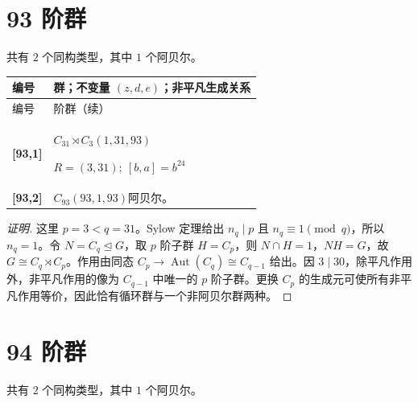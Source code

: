 \documentclass[UTF8,fontset=fandol,11pt,a4paper]{ctexart}
\newcommand{\Aut}{\operatorname{Aut}}\newcommand{\GL}{\operatorname{GL}}\newcommand{\ord}{\operatorname{ord}}\newcommand{\Z}{\mathrm Z}
\begin{document}
\section*{93 阶群}\label{order:93}

共有 $2$ 个同构类型，其中 $1$ 个阿贝尔。

\begingroup\small\setlength{\tabcolsep}{3pt}\renewcommand{\arraystretch}{1.12}

\begin{longtable}{@{}p{17mm}>{\raggedright\arraybackslash}p{141mm}@{}}

\toprule 编号 & 群；不变量 $(z,d,e)$；非平凡生成关系\\\midrule\endfirsthead

\toprule 编号 & 93 阶群（续）\\\midrule\endhead\bottomrule\endfoot

\textbf{[93,1]} & $C_{31}\rtimes C_{3}$\quad $(1,31,93)$\par\(R=(3,31);\allowbreak\ [b,a]=b^{24}\)\\[3pt]

\textbf{[93,2]} & $C_{93}$\quad $(93,1,93)$\quad 阿贝尔。\\[3pt]

\end{longtable}\endgroup

\begin{proof}[证明]
这里 $p=3<q=31$。Sylow 定理给出 $n_q\mid p$ 且 $n_q\equiv1\pmod q$，所以 $n_q=1$。令 $N=C_q\trianglelefteq G$，取 $p$ 阶子群 $H=C_p$，则 $N\cap H=1$，$NH=G$，故 $G\cong C_q\rtimes C_p$。作用由同态 $C_p\to\Aut(C_q)\cong C_{q-1}$ 给出。因 $3\mid 30$，除平凡作用外，非平凡作用的像为 $C_{q-1}$ 中唯一的 $p$ 阶子群。更换 $C_p$ 的生成元可使所有非平凡作用等价，因此恰有循环群与一个非阿贝尔群两种。
\end{proof}

\section*{94 阶群}\label{order:94}

共有 $2$ 个同构类型，其中 $1$ 个阿贝尔。

\begingroup\small\setlength{\tabcolsep}{3pt}\renewcommand{\arraystretch}{1.12}
\end{document}
